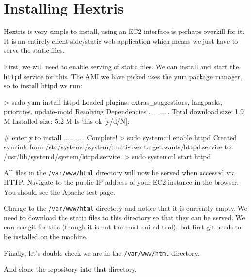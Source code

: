 \documentclass{csse4400}
\begin{document}
\section{Installing Hextris}
Hextris is very simple to install, using an EC2 interface is perhaps overkill for it.
It is an entirely client-side/static web application which means we just have to serve the static files.

First, we will need to enable serving of static files.
We can install and start the \texttt{httpd} service for this.
The AMI we have picked uses the yum package manager, so to install httpd we run:

\begin{code}[language=bash,numbers=none]{}
> sudo yum install httpd
Loaded plugins: extras_suggestions, langpacks, priorities, update-motd
Resolving Dependencies
..... 
..... 
Total download size: 1.9 M
Installed size: 5.2 M
Is this ok [y/d/N]:

# enter y to install
..... 
..... 
Complete!
> sudo systemctl enable httpd
Created symlink from /etc/systemd/system/multi-user.target.wants/httpd.service to /usr/lib/systemd/system/httpd.service.
> sudo systemctl start httpd
\end{code}

All files in the \texttt{/var/www/html} directory will now be served when accessed via HTTP.
Navigate to the public IP address of your EC2 instance in the browser.
You should see the Apache test page.

Change to the \texttt{/var/www/html} directory and notice that it is currently empty.
We need to download the static files to this directory so that they can be served.
We can use git for this (though it is not the most suited tool),
but first git needs to be installed on the machine.


Finally, let's double check we are in the \texttt{/var/www/html} directory.



And clone the repository into that directory.


\end{document}
